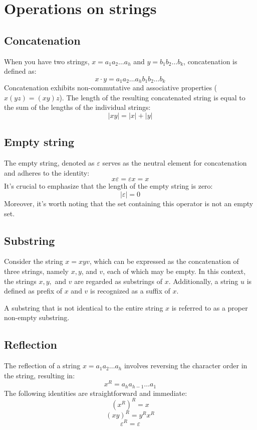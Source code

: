 \section{Operations on strings}

\subsection*{Concatenation}
When you have two strings, $x=a_1a_2\dots a_h$ and $y=b_1b_2\dots b_k$, concatenation is defined as:
\[x \cdot y = a_1a_2\dots a_h b_1b_2\dots b_k\]
Concatenation exhibits non-commutative and associative properties ($x(yz)=(xy)z$). 
The length of the resulting concatenated string is equal to the sum of the lengths of the individual strings:
\[\left\lvert xy \right\rvert = \left\lvert x \right\rvert + \left\lvert y \right\rvert\]

\subsection*{Empty string}
The empty string, denoted as $\varepsilon$  serves as the neutral element for concatenation and adheres to the identity:
\[x\varepsilon=\varepsilon x=x\]
It's crucial to emphasize that the length of the empty string is zero:
\[\left\lvert \varepsilon \right\rvert = 0\]
Moreover, it's worth noting that the set containing this operator is not an empty set.

\subsection*{Substring}
Consider the string $x=xyv$, which can be expressed as the concatenation of three strings, namely $x,y$, and $v$, each of which may be empty.
In this context, the strings $x, y,$ and $v$ are regarded as substrings of $x$. 
Additionally, a string $u$ is defined as prefix of $x$ and $v$ is recognized as a suffix of $x$. 

A substring that is not identical to the entire string $x$ is referred to as a proper non-empty substring.

\subsection*{Reflection}
The reflection of a string $x=a_1a_2\dots a_h$ involves reversing the character order in the string, resulting in:
\[x^R=a_ha_{h-1}\dots a_1\]
The following identities are straightforward and immediate:
\[(x^R)^R=x\]
\[(xy)^R=y^Rx^R\]
\[\varepsilon^R=\varepsilon\]

